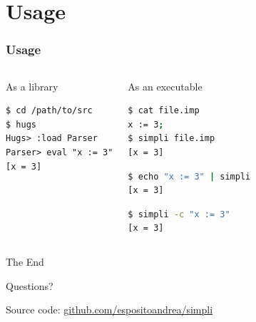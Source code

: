 \documentclass{beamer}
\begin{document}
\section{Usage}
\begin{frame}[fragile]
	\frametitle{Usage}
	\begin{columns}
		\begin{block}{As a library}
\begin{lstlisting}
$ cd /path/to/src
$ hugs
Hugs> :load Parser
Parser> eval "x := 3"
[x = 3]
\end{lstlisting}
			\end{block}
		\begin{block}{As an executable}
\begin{lstlisting}[language=sh]
$ cat file.imp
x := 3;
$ simpli file.imp
[x = 3]
\end{lstlisting}
\begin{lstlisting}[language=sh]
$ echo "x := 3" | simpli
[x = 3]
\end{lstlisting}
\begin{lstlisting}[language=sh]
$ simpli -c "x := 3"
[x = 3]
\end{lstlisting}
		\end{block}
	\end{columns}
\end{frame}


{
	\settocustomtemplate
	\begin{frame}
		\color{white}
		\vfill
		\begin{center}
			\Large
			The End
		\end{center}
		\begin{center}
			\small
			Questions?
		\end{center}
		\vfill
		\begin{center}
			\scriptsize
			Source code:
			\href{https://github.com/espositoandrea/simpli}{%
				\color{mylinkcolor}github.com/espositoandrea/simpli
			}
		\end{center}
	\end{frame}
}
\end{document}
